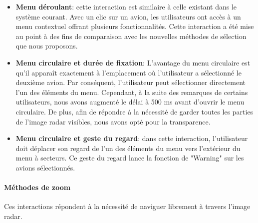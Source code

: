 \begin{itemize}

\item \textbf{ Menu déroulant}: cette interaction est similaire à celle existant dans le système courant. Avec un clic sur un avion, les utilisateurs ont accès à un menu contextuel offrant plusieurs fonctionnalités. Cette interaction a été mise au point à des fins de comparaison avec les nouvelles
méthodes de sélection que nous proposons.

\item \textbf{Menu circulaire et durée de fixation}: L’avantage du menu circulaire est qu’il apparaît exactement à l'emplacement où l'utilisateur a sélectionné le deuxième avion.
Par conséquent, l'utilisateur peut sélectionner directement l'un des éléments du menu.
Cependant, à la suite des remarques de certains utilisateurs, nous avons
augmenté le délai à 500 ms avant d'ouvrir le menu circulaire.
De plus, afin de répondre à la nécessité de garder toutes les parties de l’image radar visibles, nous avons opté pour la transparence.

\item \textbf {Menu circulaire et geste du regard}: dans cette interaction, l’utilisateur doit déplacer son regard de l’un des éléments du menu vers l’extérieur du menu à secteurs. Ce geste du regard lance la fonction de "Warning" sur les avions sélectionnés.

\end{itemize}
 
\paragraph{Méthodes de zoom}
Ces interactions répondent à la nécessité de naviguer librement à travers l'image radar.

